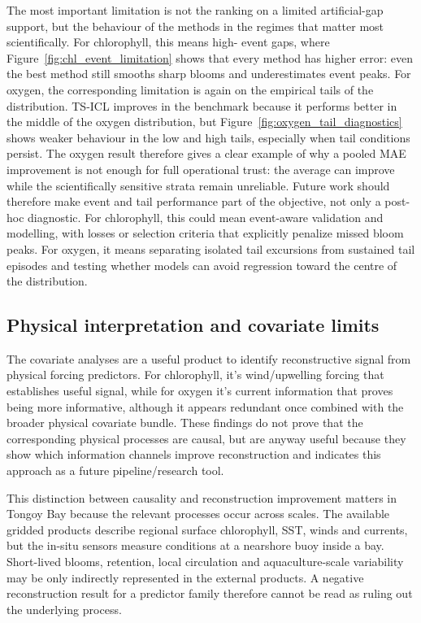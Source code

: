 The most important limitation is not the ranking on a limited artificial-gap support, but the behaviour of the methods in the regimes that matter most scientifically. For chlorophyll, this means high-\chl{} event gaps, where Figure~\ref{fig:chl_event_limitation} shows that every method has higher error: even the best method still smooths sharp blooms and underestimates event peaks.
For oxygen, the corresponding limitation is again on the empirical tails of the distribution. TS-ICL improves in the benchmark because it performs better in the middle of
the oxygen distribution, but Figure~\ref{fig:oxygen_tail_diagnostics} shows weaker behaviour in the low and high tails, especially when tail conditions persist. The oxygen result therefore gives a
clear example of why a pooled MAE improvement is not enough for full operational trust: the average can
improve while the scientifically sensitive strata remain unreliable. Future work should therefore make event and tail performance part of the objective, not only a
post-hoc diagnostic. For chlorophyll, this could mean event-aware validation and modelling, with
losses or selection criteria that explicitly penalize missed bloom peaks. For oxygen, it means
separating isolated tail excursions from sustained tail episodes and testing whether models can
avoid regression toward the centre of the distribution. 

\subsection{Physical interpretation and covariate limits}
\label{sec:limits_physical}

The covariate analyses are a useful product to identify reconstructive signal from physical forcing predictors. For chlorophyll, it's wind/upwelling forcing that establishes useful signal, while for oxygen it's current information that proves being more informative, although it appears redundant once combined with
the broader physical covariate bundle. These findings do not
prove that the corresponding physical processes are causal, but are anyway useful because they
show which information channels improve reconstruction and indicates this approach as a future pipeline/research tool.

This distinction between causality and reconstruction improvement matters in Tongoy Bay because the relevant processes occur across scales. The
available gridded products describe regional surface chlorophyll, SST, winds and currents, but the
in-situ sensors measure conditions at a nearshore buoy inside a bay. Short-lived blooms, retention,
local circulation and aquaculture-scale variability may be only indirectly represented in the external products. A
negative reconstruction result for a predictor family therefore cannot be read as ruling out the
underlying process.

